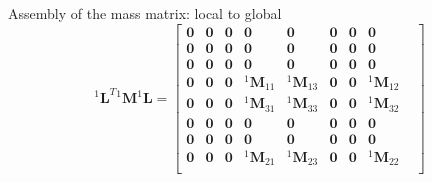 \documentclass[aspectratio=169]{beamer}
\begin{document}
{\begin{frame}{Assembly of the mass matrix: local to global}
  $$    {}^1\mathbf L^T {}^1\mathbf M{}^1\mathbf L=\begin{bmatrix}
      \mathbf 0 & \mathbf 0 & \mathbf 0 & \mathbf 0          & \mathbf 0          & \mathbf 0 & \mathbf 0 & \mathbf 0          & \\
      \mathbf 0 & \mathbf 0 & \mathbf 0 & \mathbf 0          & \mathbf 0          & \mathbf 0 & \mathbf 0 & \mathbf 0          & \\
      \mathbf 0 & \mathbf 0 & \mathbf 0 & \mathbf 0          & \mathbf 0          & \mathbf 0 & \mathbf 0 & \mathbf 0          & \\
      \mathbf 0 & \mathbf 0 & \mathbf 0 & {}^1\mathbf M_{11} & {}^1\mathbf M_{13} & \mathbf 0 & \mathbf 0 & {}^1\mathbf M_{12} & \\
      \mathbf 0 & \mathbf 0 & \mathbf 0 & {}^1\mathbf M_{31} & {}^1\mathbf M_{33} & \mathbf 0 & \mathbf 0 & {}^1\mathbf M_{32} & \\
      \mathbf 0 & \mathbf 0 & \mathbf 0 & \mathbf 0          & \mathbf 0          & \mathbf 0 & \mathbf 0 & \mathbf 0          & \\
      \mathbf 0 & \mathbf 0 & \mathbf 0 & \mathbf 0          & \mathbf 0          & \mathbf 0 & \mathbf 0 & \mathbf 0          & \\
      \mathbf 0 & \mathbf 0 & \mathbf 0 & {}^1\mathbf M_{21} & {}^1\mathbf M_{23} & \mathbf 0 & \mathbf 0 & {}^1\mathbf M_{22} & \\
    \end{bmatrix}$$
\end{frame}

}
\end{document}
